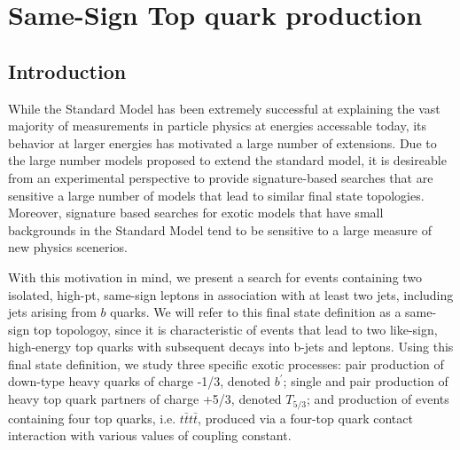 
\section{Same-Sign Top quark production}

\subsection{Introduction}

While the Standard Model has been extremely successful at explaining the vast majority of measurements in particle physics at energies accessable today, its behavior at larger energies has motivated a large number of extensions.
Due to the large number models proposed to extend the standard model, it is desireable from an experimental perspective to provide signature-based searches that are sensitive a large number of models that lead to similar final state topologies.
Moreover, signature based searches for exotic models that have small backgrounds in the Standard Model tend to be sensitive to a large measure of new physics scenerios.

With this motivation in mind, we present a search for events containing two isolated, high-pt, same-sign leptons in association with at least two jets, including jets arising from $b$ quarks. 
We will refer to this final state definition as a same-sign top topologoy, since it is characteristic of events that lead to two like-sign, high-energy top quarks with subsequent decays into b-jets and leptons.
Using this final state definition, we study three specific exotic processes: pair production of down-type heavy quarks of charge -1/3, denoted $b^\prime$; single and pair production of heavy top quark partners of charge +5/3, denoted $T_{5/3}$; and production of events containing four top quarks, i.e. $t\bar{t}t\bar{t}$, produced via a four-top quark contact interaction with various values of coupling constant.


